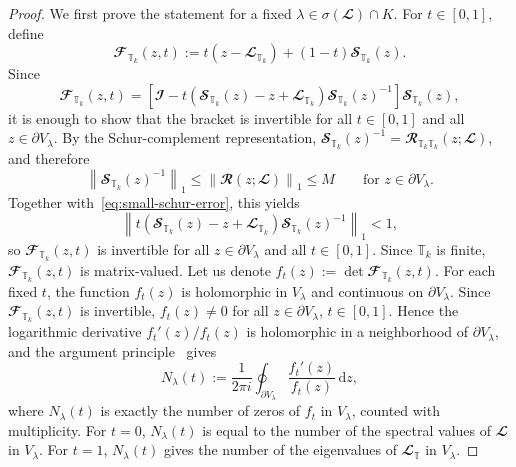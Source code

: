\documentclass[10pt,a4paper]{amsart}
\newcommand{\LI}{{\mathbb T}}
\begin{document}
\begin{proof}
    We first prove the statement for a fixed \(\lambda \in \sigma(\mathbfcal L)\cap K\). For \(t \in [0,1]\), define
    \begin{equation}
        \mathbfcal F_{\LI_k}(z,t)
        :=
        t\left(z-\mathbfcal L_{\LI_k}\right)
        +
        (1-t)\mathbfcal S_{\LI_k}(z).
    \end{equation}
    Since
    \begin{equation}
        \mathbfcal F_{\LI_k}(z,t)
        =
        \left[
            \mathbfcal I
            -
            t\left(
                \mathbfcal S_{\LI_k}(z)-z+\mathbfcal L_{\LI_k}
            \right)
            \mathbfcal S_{\LI_k}(z)^{-1}
        \right]
    \mathbfcal S_{\LI_k}(z),
    \end{equation}
    it is enough to show that the bracket is invertible for all $t\in[0, 1]$ and all $z \in \partial V_\lambda$. By the Schur-complement representation,
        $\mathbfcal S_{\LI_k}(z)^{-1}
        =
        \mathbfcal R_{\LI_k \LI_k}(z;\mathbfcal L)
        $,
    and therefore
    \begin{equation}
        \left \|
        \mathbfcal S_{\LI_k}(z)^{-1}
        \right \|_1
        \leqslant
        \left \|
        \mathbfcal R(z;\mathbfcal L)
        \right \|_1
        \leqslant
        M
        \qquad
        \text{for } z \in \partial V_\lambda.
    \end{equation}
    Together with~\eqref{eq:small-schur-error}, this yields
    \begin{equation}
        \left \|
        t\left(
            \mathbfcal S_{\LI_k}(z)-z+\mathbfcal L_{\LI_k}
        \right)
        \mathbfcal S_{\LI_k}(z)^{-1}
        \right \|_1
        < 1,
    \end{equation}
    so \(\mathbfcal F_{\LI_k}(z,t)\) is invertible for all \(z \in \partial V_\lambda\) and all \(t \in [0,1]\).
    Since \(\LI_k\) is finite, \(\mathbfcal F_{\LI_k}(z,t)\) is matrix-valued.      Let us denote
    $f_t(z) := \det \mathbfcal F_{\LI_k}(z,t)$.
    For each fixed \(t\), the function \(f_t(z)\) is holomorphic in \(V_\lambda\) and continuous on \(\partial V_\lambda\). Since $\mathbfcal F_{\LI_k}(z, t)$ is invertible,
    $f_t(z) \neq 0$
    for all  $z \in \partial V_\lambda$, $t \in [0,1]$.
    Hence the logarithmic derivative \(f_t'(z)/f_t(z)\) is holomorphic in a neighborhood of \(\partial V_\lambda\), and the argument principle~\cite{Ablowitz2003} gives
    \begin{equation}
        N_\lambda(t)
        :=
        \frac{1}{2\pi i}
        \oint_{\partial V_\lambda}
        \frac{f_t'(z)}{f_t(z)}\,\mathrm dz,
        \label{eq:Nt-argument-principle}
    \end{equation}
    where \(N_\lambda(t)\) is exactly the number of zeros of \(f_t\) in \(V_\lambda\), counted with multiplicity. For \(t=0\), $N_\lambda(t)$ is equal to the number of the spectral values of \(\mathbfcal L\) in \(V_\lambda\). For \(t=1\), $N_\lambda(t)$ gives the number of the eigenvalues of \(\mathbfcal L_\LI\) in \(V_\lambda\).


\end{proof}
\end{document}
